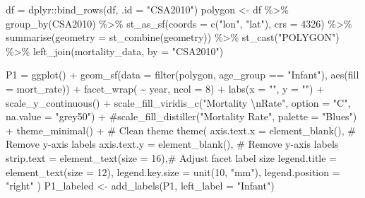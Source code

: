 \documentclass[
  letterpaper,
  DIV=11,
  numbers=noendperiod]{scrartcl}
\newenvironment{Shaded}{\begin{snugshade}}{\end{snugshade}}
\newcommand{\AttributeTok}[1]{\textcolor[rgb]{0.40,0.45,0.13}{#1}}
\newcommand{\CommentTok}[1]{\textcolor[rgb]{0.37,0.37,0.37}{#1}}
\newcommand{\DecValTok}[1]{\textcolor[rgb]{0.68,0.00,0.00}{#1}}
\newcommand{\FunctionTok}[1]{\textcolor[rgb]{0.28,0.35,0.67}{#1}}
\newcommand{\NormalTok}[1]{\textcolor[rgb]{0.00,0.23,0.31}{#1}}
\newcommand{\OtherTok}[1]{\textcolor[rgb]{0.00,0.23,0.31}{#1}}
\newcommand{\SpecialCharTok}[1]{\textcolor[rgb]{0.37,0.37,0.37}{#1}}
\newcommand{\StringTok}[1]{\textcolor[rgb]{0.13,0.47,0.30}{#1}}
\begin{document}
\begin{Shaded}
\begin{Highlighting}[]
\NormalTok{df }\OtherTok{=}\NormalTok{ dplyr}\SpecialCharTok{::}\FunctionTok{bind\_rows}\NormalTok{(df, }\AttributeTok{.id =} \StringTok{"CSA2010"}\NormalTok{)}
\NormalTok{polygon }\OtherTok{\textless{}{-}}\NormalTok{ df }\SpecialCharTok{\%\textgreater{}\%}
  \FunctionTok{group\_by}\NormalTok{(CSA2010) }\SpecialCharTok{\%\textgreater{}\%}
  \FunctionTok{st\_as\_sf}\NormalTok{(}\AttributeTok{coords =} \FunctionTok{c}\NormalTok{(}\StringTok{"lon"}\NormalTok{, }\StringTok{"lat"}\NormalTok{), }\AttributeTok{crs =} \DecValTok{4326}\NormalTok{) }\SpecialCharTok{\%\textgreater{}\%}
  \FunctionTok{summarise}\NormalTok{(}\AttributeTok{geometry =} \FunctionTok{st\_combine}\NormalTok{(geometry)) }\SpecialCharTok{\%\textgreater{}\%}
  \FunctionTok{st\_cast}\NormalTok{(}\StringTok{"POLYGON"}\NormalTok{) }\SpecialCharTok{\%\textgreater{}\%}
  \FunctionTok{left\_join}\NormalTok{(mortality\_data, }\AttributeTok{by =} \StringTok{"CSA2010"}\NormalTok{)}

\NormalTok{P1 }\OtherTok{=} \FunctionTok{ggplot}\NormalTok{() }\SpecialCharTok{+}
  \FunctionTok{geom\_sf}\NormalTok{(}\AttributeTok{data =} \FunctionTok{filter}\NormalTok{(polygon, age\_group }\SpecialCharTok{==} \StringTok{"Infant"}\NormalTok{), }\FunctionTok{aes}\NormalTok{(}\AttributeTok{fill =}\NormalTok{ mort\_rate)) }\SpecialCharTok{+}
  \FunctionTok{facet\_wrap}\NormalTok{( }\SpecialCharTok{\textasciitilde{}}\NormalTok{ year, }\AttributeTok{ncol =} \DecValTok{8}\NormalTok{) }\SpecialCharTok{+} 
  \FunctionTok{labs}\NormalTok{(}\AttributeTok{x =} \StringTok{""}\NormalTok{, }\AttributeTok{y =} \StringTok{""}\NormalTok{) }\SpecialCharTok{+}
  \FunctionTok{scale\_y\_continuous}\NormalTok{() }\SpecialCharTok{+}
  \FunctionTok{scale\_fill\_viridis\_c}\NormalTok{(}\StringTok{"Mortality }\SpecialCharTok{\textbackslash{}n}\StringTok{Rate"}\NormalTok{, }\AttributeTok{option =} \StringTok{"C"}\NormalTok{, }\AttributeTok{na.value =} \StringTok{"grey50"}\NormalTok{) }\SpecialCharTok{+}
  \CommentTok{\#scale\_fill\_distiller("Mortality Rate", palette = "Blues") + }
  \FunctionTok{theme\_minimal}\NormalTok{() }\SpecialCharTok{+} \CommentTok{\# Clean theme}
  \FunctionTok{theme}\NormalTok{(}
    \AttributeTok{axis.text.x =} \FunctionTok{element\_blank}\NormalTok{(), }\CommentTok{\# Remove y{-}axis labels}
    \AttributeTok{axis.text.y =} \FunctionTok{element\_blank}\NormalTok{(), }\CommentTok{\# Remove y{-}axis labels}
    \AttributeTok{strip.text =} \FunctionTok{element\_text}\NormalTok{(}\AttributeTok{size =} \DecValTok{16}\NormalTok{),}\CommentTok{\# Adjust facet label size}
    \AttributeTok{legend.title =} \FunctionTok{element\_text}\NormalTok{(}\AttributeTok{size =} \DecValTok{12}\NormalTok{),}
    \AttributeTok{legend.key.size =} \FunctionTok{unit}\NormalTok{(}\DecValTok{10}\NormalTok{, }\StringTok{"mm"}\NormalTok{),}
    \AttributeTok{legend.position =} \StringTok{"right"}
\NormalTok{  )}
\NormalTok{P1\_labeled }\OtherTok{\textless{}{-}} \FunctionTok{add\_labels}\NormalTok{(P1, }\AttributeTok{left\_label =} \StringTok{"Infant"}\NormalTok{)}
\end{Highlighting}
\end{Shaded}
\end{document}

